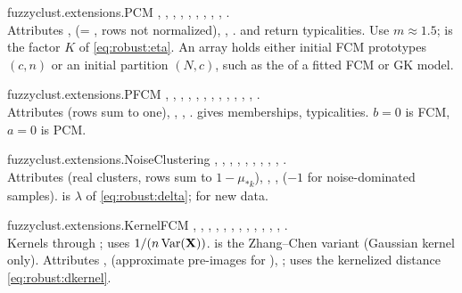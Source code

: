 \begin{apibox}{fuzzyclust.extensions.PCM}
, , , , , , , , , .\\
Attributes ,  (= , rows not normalized), , .  and  return typicalities. Use $m\approx1.5$;  is the factor $K$ of \eqref{eq:robust:eta}. An  array holds either initial FCM prototypes $(c,n)$ or an initial partition $(N,c)$, such as the  of a fitted FCM or GK model.
\end{apibox}

\begin{apibox}{fuzzyclust.extensions.PFCM}
, , , , , , , , , , , , .\\
Attributes  (rows sum to one), , , .  gives memberships,  typicalities. $b=0$ is FCM, $a=0$ is PCM.
\end{apibox}

\begin{apibox}{fuzzyclust.extensions.NoiseClustering}
, , , , , , , , , .\\
Attributes  (real clusters, rows sum to $1-\mu_{*k}$), , ,  ($-1$ for noise-dominated samples).  is $\lambda$ of \eqref{eq:robust:delta};  for new data.
\end{apibox}

\begin{apibox}{fuzzyclust.extensions.KernelFCM}
, , , , , , , , , , , , .\\
Kernels through ;  uses $1/(n\,\mathrm{Var}(\mathbf{X}))$.  is the Zhang--Chen variant (Gaussian kernel only). Attributes ,  (approximate pre-images for ), ;  uses the kernelized distance \eqref{eq:robust:dkernel}.
\end{apibox}

